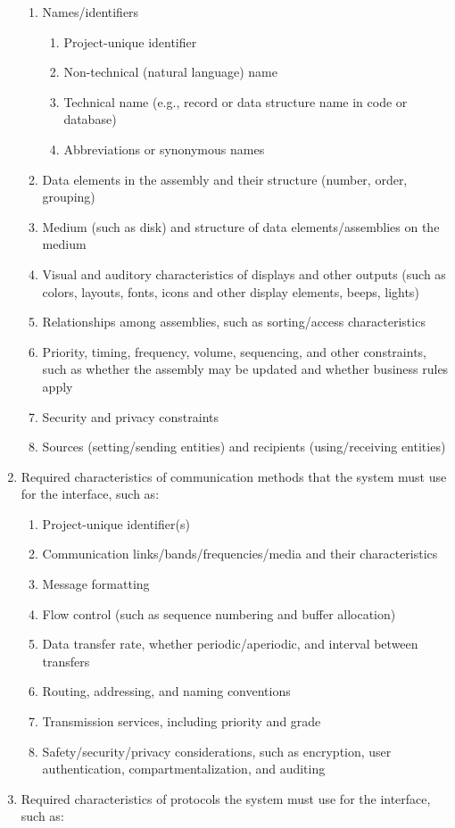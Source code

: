 \documentclass{fidata-report-template}
\begin{document}
\begin{enumerate}
  \begin{enumerate}
  \itemsep1pt\parskip0pt
  \item
    Names/identifiers

    \begin{enumerate}
    \itemsep1pt\parskip0pt
    \item
      Project-unique identifier
    \item
      Non-technical (natural language) name
    \item
      Technical name (e.g., record or data structure name in code or
      database)
    \item
      Abbreviations or synonymous names
    \end{enumerate}
  \item
    Data elements in the assembly and their structure (number, order,
    grouping)
  \item
    Medium (such as disk) and structure of data elements/assemblies on
    the medium
  \item
    Visual and auditory characteristics of displays and other outputs
    (such as colors, layouts, fonts, icons and other display elements,
    beeps, lights)
  \item
    Relationships among assemblies, such as sorting/access
    characteristics
  \item
    Priority, timing, frequency, volume, sequencing, and other
    constraints, such as whether the assembly may be updated and whether
    business rules apply
  \item
    Security and privacy constraints
  \item
    Sources (setting/sending entities) and recipients (using/receiving
    entities)
  \end{enumerate}
\item
  Required characteristics of communication methods that the system must
  use for the interface, such as:

  \begin{enumerate}
  \itemsep1pt\parskip0pt
  \item
    Project-unique identifier(s)
  \item
    Communication links/bands/frequencies/media and their
    characteristics
  \item
    Message formatting
  \item
    Flow control (such as sequence numbering and buffer allocation)
  \item
    Data transfer rate, whether periodic/aperiodic, and interval between
    transfers
  \item
    Routing, addressing, and naming conventions
  \item
    Transmission services, including priority and grade
  \item
    Safety/security/privacy considerations, such as encryption, user
    authentication, compartmentalization, and auditing
  \end{enumerate}
\item
  Required characteristics of protocols the system must use for the
  interface, such as:


\end{enumerate}
\end{document}
